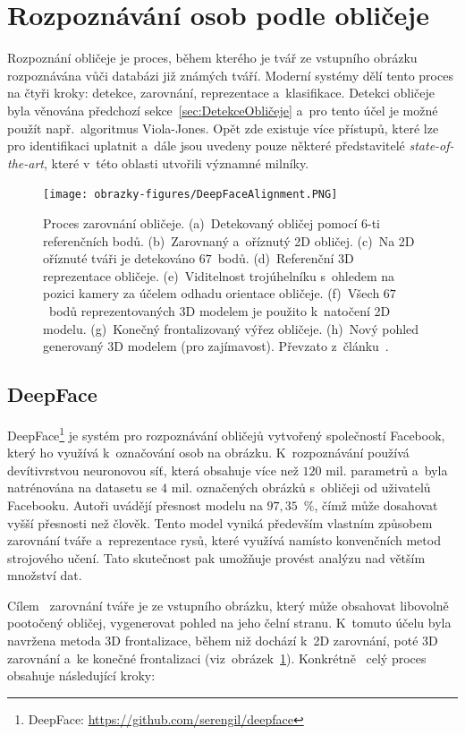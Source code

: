 \section{Rozpoznávání osob podle obličeje}
Rozpoznání obličeje je proces, během kterého je tvář ze vstupního obrázku rozpoznávána vůči databázi již známých tváří. Moderní systémy dělí tento proces na čtyři kroky: detekce, zarovnání, reprezentace a~klasifikace. Detekci obličeje byla věnována předchozí sekce~\ref{sec:DetekceObličeje} a~pro tento účel je možné použít např.~algoritmus Viola-Jones. Opět zde existuje více přístupů, které lze pro identifikaci uplatnit a~dále jsou uvedeny pouze některé představitelé \emph{state-of-the-art}, které v~této oblasti utvořili významné milníky.

\begin{figure}[hbt]
	\centering
	\setlength{\fboxsep}{0pt}
	\texttt{[image: obrazky-figures/DeepFaceAlignment.PNG]}
	\caption{Proces zarovnání obličeje. (a)~Detekovaný obličej pomocí $6$-ti referenčních bodů. (b)~Zarovnaný a~oříznutý 2D obličej. (c)~Na 2D oříznuté tváři je detekováno $67$~bodů. (d)~Referenční 3D reprezentace obličeje. (e)~Viditelnost trojúhelníku s~ohledem na pozici kamery za účelem odhadu orientace obličeje. (f)~Všech $67$~bodů reprezentovaných 3D modelem je použito k~natočení 2D modelu. (g)~Konečný frontalizovaný výřez obličeje. (h)~Nový pohled generovaný 3D modelem (pro zajímavost). Převzato z~článku~\cite{article:DeepFace}.}
	\label{img:DeepFaceAlignment}
\end{figure}

\subsection{DeepFace}
\label{sec:DeepFace}
DeepFace\footnote{DeepFace: \url{https://github.com/serengil/deepface}} je systém pro rozpoznávání obličejů vytvořený společností Facebook, který ho využívá k~označování osob na obrázku. K~rozpoznávání používá devítivrstvou neuronovou síť, která obsahuje více než $120$ mil. parametrů a~byla natrénována na datasetu se $4$ mil. označených obrázků s~obličeji od uživatelů Facebooku. Autoři uvádějí přesnost modelu na $97,35$~\%, čímž může dosahovat vyšší přesnosti než člověk. Tento model vyniká především vlastním způsobem zarovnání tváře a~reprezentace rysů, které využívá namísto konvenčních metod strojového učení. Tato skutečnost pak umožňuje provést analýzu nad větším množství dat.

Cílem~\cite{website:DeepFace} zarovnání tváře je ze vstupního obrázku, který může obsahovat libovolně pootočený obličej, vygenerovat pohled na jeho čelní stranu. K~tomuto účelu byla navržena metoda 3D frontalizace, během niž dochází k~2D zarovnání, poté 3D zarovnání a~ke konečné frontalizaci (viz~obrázek~\ref{img:DeepFaceAlignment}). Konkrétně~\cite{article:DeepFace} celý proces obsahuje následující kroky:

